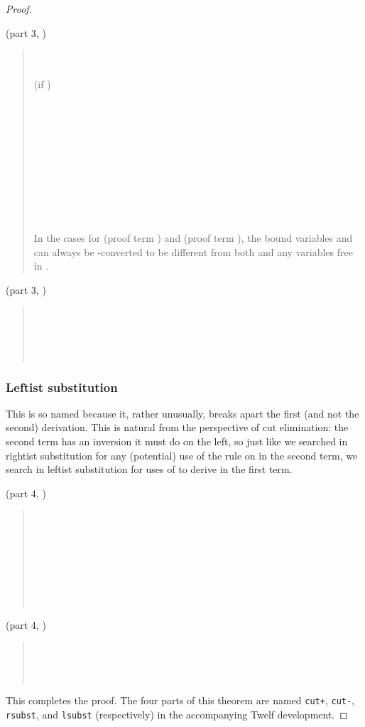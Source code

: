 \documentclass[acmtocl]{robtrans}\pdfoutput=1
\begin{document}
\begin{proof}
\begin{quote}
\end{quote}

\medskip
\fbox{} (part 3, )
\begin{quote}
\\
\\

   \qquad (if )\\
\\
\\
\\
\\
\\
\\
\\
\\
\\
\\


\medskip
In the cases for  (proof term ) and 
(proof term ), the bound variables
 and  can always be 
-converted to be different from both  and any variables free in .
\end{quote}

\medskip
\fbox{} (part 3, )

\begin{quote}
\\ 
\\
\\
\\

\end{quote}

\subsubsection*{Leftist substitution} 
This is so named because it, rather unusually, breaks apart the first
(and not the second) derivation. This is natural from the perspective
of cut elimination: the second term  has an inversion it must do on
the left, so just like we searched in rightist substitution for any
(potential) use of the  rule on  in the second term, we
search in leftist substitution for uses of  to derive
 in the first term.

\bigskip
\fbox{} (part 4, )
\begin{quote}
\\
\\
\\
\\
\\
\\
\\

\end{quote}

\medskip
\fbox{} (part 4, )
\begin{quote}
\\
\\
\\

\end{quote}

\noindent
This completes the proof. The four parts of this theorem are named
{\tt cut+}, {\tt cut-}, {\tt rsubst}, and {\tt lsubst} (respectively)
in the accompanying Twelf development.
\end{proof}
\end{document}
